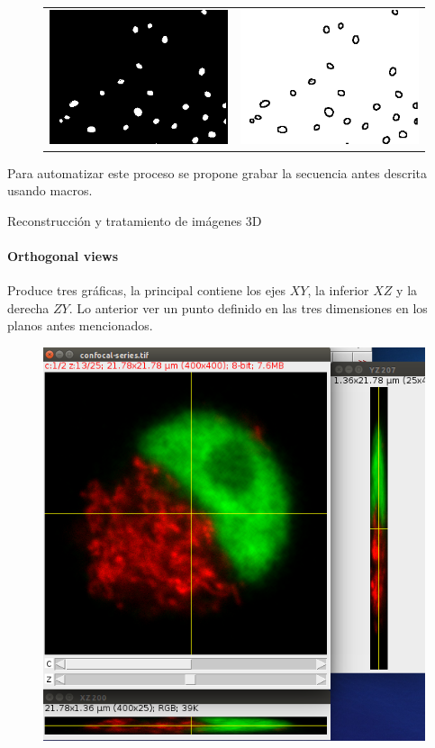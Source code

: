 \documentclass[addpoints,10pt]{exam}
\begin{document}
\begin{questions}
		\begin{figure}[h]
			\centering
			\begin{tabular}{cc}
				\includegraphics[width=0.35\linewidth]{threshold.png} & \includegraphics[width=0.35\linewidth]{edges.png}
			\end{tabular}
		\end{figure}
	
		
		
		Para automatizar este proceso se propone grabar la secuencia antes descrita usando macros.
		
		
		
		{\question Reconstrucci\'on y tratamiento de im\'agenes 3D}
		\paragraph{Orthogonal views}
			Produce tres gr\'aficas, la principal contiene los ejes $XY$, la inferior $XZ$ y la derecha $ZY$. Lo anterior ver un punto definido en las tres dimensiones en los planos antes mencionados. 
			\begin{figure}[h]
				\centering
				\includegraphics[width=0.5\linewidth]{ortogonales.png}
			\end{figure}
			

\end{questions}
\end{document}
